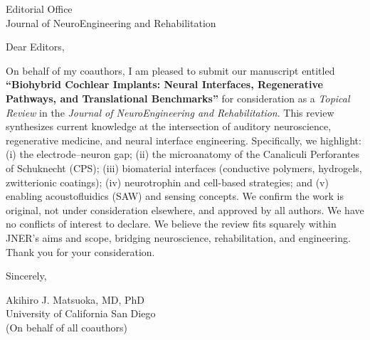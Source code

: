 \documentclass[11pt]{letter}
\begin{document}
\begin{letter}{Editorial Office \\ Journal of NeuroEngineering and Rehabilitation}
\opening{Dear Editors,}
On behalf of my coauthors, I am pleased to submit our manuscript entitled
\textbf{“Biohybrid Cochlear Implants: Neural Interfaces, Regenerative Pathways, and Translational Benchmarks”}
for consideration as a \emph{Topical Review} in the \emph{Journal of NeuroEngineering and Rehabilitation}.
This review synthesizes current knowledge at the intersection of auditory neuroscience, regenerative medicine, and neural interface engineering. Specifically, we highlight: (i) the electrode–neuron gap; (ii) the microanatomy of the Canaliculi Perforantes of Schuknecht (CPS); (iii) biomaterial interfaces (conductive polymers, hydrogels, zwitterionic coatings); (iv) neurotrophin and cell-based strategies; and (v) enabling acoustofluidics (SAW) and sensing concepts.
We confirm the work is original, not under consideration elsewhere, and approved by all authors. We have no conflicts of interest to declare.
We believe the review fits squarely within JNER’s aims and scope, bridging neuroscience, rehabilitation, and engineering. Thank you for your consideration.
\closing{Sincerely,}
\vspace{1em}
Akihiro J. Matsuoka, MD, PhD \\
University of California San Diego \\
(On behalf of all coauthors)
\end{letter}
\end{document}
